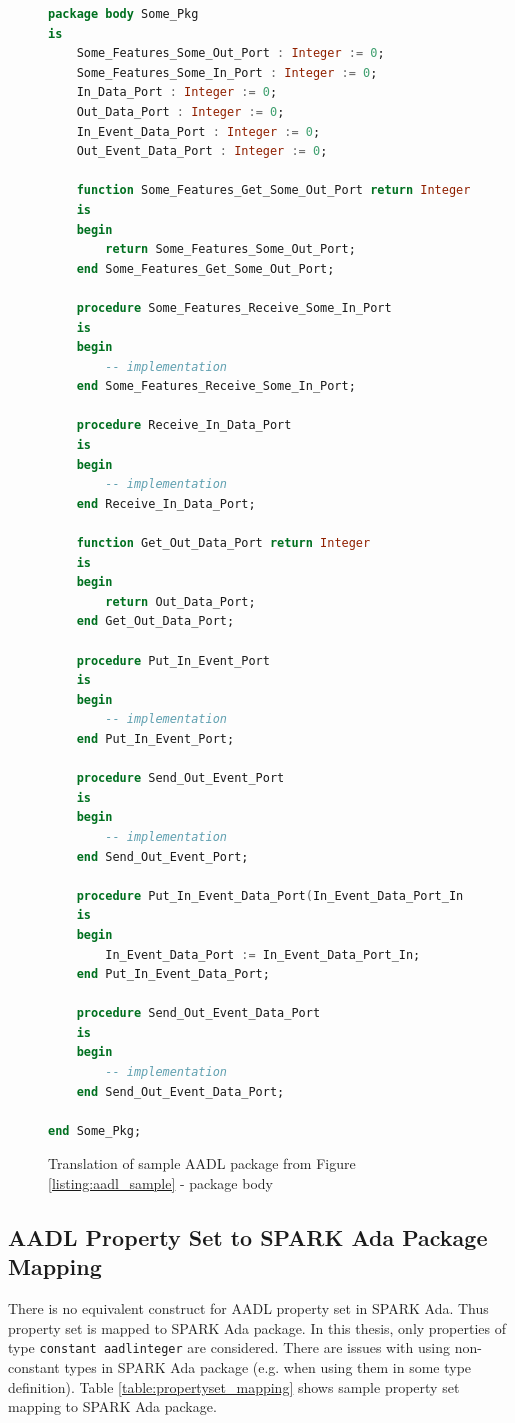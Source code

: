 \begin{figure}
\singlespacing
\begin{lstlisting}[language=ada, frame=single, gobble=0]
package body Some_Pkg
is
    Some_Features_Some_Out_Port : Integer := 0;
    Some_Features_Some_In_Port : Integer := 0;
    In_Data_Port : Integer := 0;
    Out_Data_Port : Integer := 0;
    In_Event_Data_Port : Integer := 0;
    Out_Event_Data_Port : Integer := 0;

    function Some_Features_Get_Some_Out_Port return Integer
    is
    begin
        return Some_Features_Some_Out_Port;
    end Some_Features_Get_Some_Out_Port;

    procedure Some_Features_Receive_Some_In_Port
    is
    begin
        -- implementation
    end Some_Features_Receive_Some_In_Port;

    procedure Receive_In_Data_Port
    is
    begin
        -- implementation
    end Receive_In_Data_Port;

    function Get_Out_Data_Port return Integer
    is
    begin
        return Out_Data_Port;
    end Get_Out_Data_Port;

    procedure Put_In_Event_Port
    is
    begin
        -- implementation
    end Put_In_Event_Port;

    procedure Send_Out_Event_Port
    is
    begin
        -- implementation
    end Send_Out_Event_Port;

    procedure Put_In_Event_Data_Port(In_Event_Data_Port_In : Integer)
    is
    begin
        In_Event_Data_Port := In_Event_Data_Port_In;
    end Put_In_Event_Data_Port;

    procedure Send_Out_Event_Data_Port
    is
    begin
        -- implementation
    end Send_Out_Event_Data_Port;

end Some_Pkg;
\end{lstlisting}
\doublespacing
\caption{Translation of sample AADL package from Figure \ref{listing:aadl_sample} - package body}
\label{listing:package_mapping_body}
\end{figure}



\subsection{AADL Property Set to SPARK Ada Package Mapping}
\label{codegen:mapping:propertyset}

There is no equivalent construct for AADL property set in SPARK Ada. Thus property set is mapped to SPARK Ada package. In this thesis, only properties of type \lstinline{constant aadlinteger} are considered. There are issues with using non-constant types in SPARK Ada package (e.g. when using them in some type definition). Table \ref{table:propertyset_mapping} shows sample property set mapping to SPARK Ada package.

